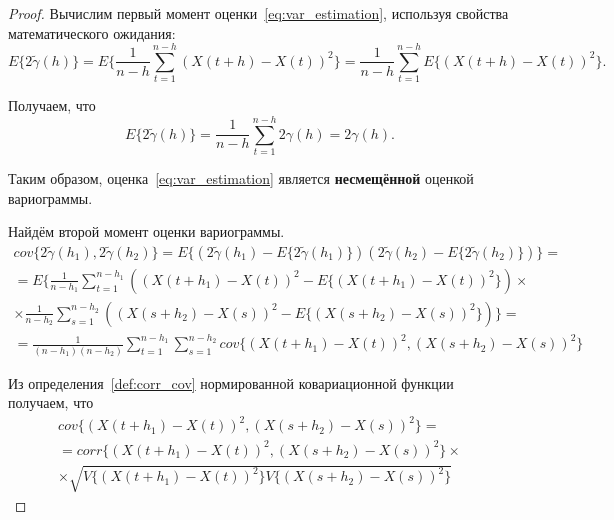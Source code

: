 \begin{proof}

Вычислим первый момент оценки~\eqref{eq:var_estimation}, используя свойства математического ожидания:
\begin{equation*}
	E \{ 2 \tilde{\gamma}(h) \} = E \{ \frac{1}{n - h} \sum_{t = 1}^{n - h} {(X(t + h) - X(t))}^2 \} = \frac{1}{n - h} \sum_{t = 1}^{n - h} E \{ { (X(t + h) - X(t)) }^2 \}.
\end{equation*}

Получаем, что
\begin{equation*}
	E \{ 2 \tilde{\gamma}(h) \} = \frac{1}{n - h} \sum_{t = 1}^{n - h} 2 \gamma(h) = 2 \gamma(h).
\end{equation*}

Таким образом, оценка~\eqref{eq:var_estimation} является \textbf{несмещённой} оценкой вариограммы.

Найдём второй момент оценки вариограммы.
\begin{equation}\begin{gathered}
\label{eq:cov_support}
	cov\{ 2 \tilde{\gamma}(h_1), 2 \tilde{\gamma}(h_2) \} = E\{ (2 \tilde{\gamma}(h_1) - E\{ 2 \tilde{\gamma}(h_1) \}) (2 \tilde{\gamma}(h_2) - E\{ 2 \tilde{\gamma}(h_2) \}) \} = \\
	= E\{ \frac{1}{n - h_1} \sum_{t = 1}^{n - h_1}({(X(t + h_1) - X(t))}^2 - E\{ {(X(t + h_1) - X(t))}^2 \}) \times \\
	\times \frac{1}{n - h_2} \sum_{s = 1}^{n - h_2}({(X(s + h_2) - X(s))}^2 - E\{ {(X(s + h_2) - X(s))}^2 \}) \} = \\
	= \frac{1}{(n - h_1)(n - h_2)} \sum_{t = 1}^{n - h_1}\sum_{s = 1}^{n - h_2} cov\{ {(X(t + h_1) - X(t))}^2, {(X(s + h_2) - X(s))}^2 \}
\end{gathered}\end{equation}

Из определения~\ref{def:corr_cov} нормированной ковариационной функции получаем, что
\begin{equation*}\begin{gathered}
	cov\{ (X(t + h_1) - X(t))^2, (X(s + h_2) - X(s))^2 \} =  \\
	= corr\{(X(t + h_1) - X(t))^2, (X(s + h_2) - X(s))^2 \} \times \\
	\times \sqrt{V\{ (X( t + h_1) - X(t))^2 \} V\{ (X(s + h_2) - X(s))^2 \}}
\end{gathered}\end{equation*}


\end{proof}
